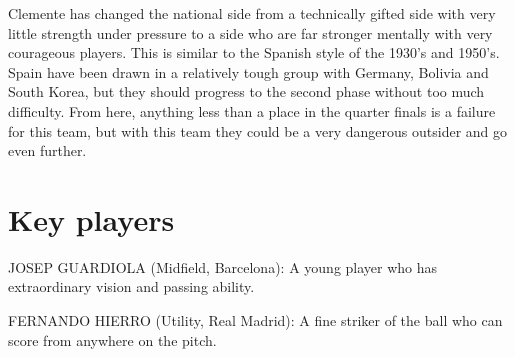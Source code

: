 Clemente has changed the national side from a technically gifted side with
very little strength under pressure to a side who are far stronger mentally
with very courageous players. This is similar to the Spanish style of the
1930's and 1950's. Spain have been drawn in a relatively tough group with 
Germany, Bolivia and South Korea, but they should progress to the second phase
without too much difficulty. From here, anything less than a place in the 
quarter finals is a failure for this team, but with this team they could be a
very dangerous outsider and go even further.
\section{Key players}
JOSEP GUARDIOLA (Midfield, Barcelona):
A young player who has extraordinary vision and passing ability.

FERNANDO HIERRO (Utility, Real Madrid):
A fine striker of the ball who can score from anywhere on the pitch.
